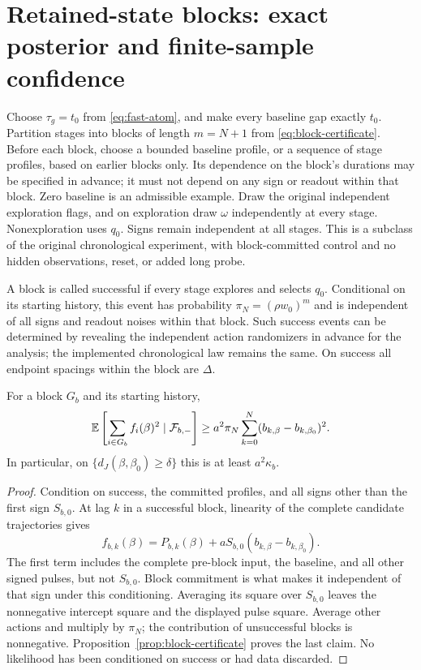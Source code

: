 \section{Retained-state blocks: exact posterior and finite-sample confidence}
\label{sec:blocks}
Choose $\tau_g=t_0$ from \eqref{eq:fast-atom}, and make every baseline gap exactly
$t_0$. Partition stages into blocks of length $m=N+1$ from
\eqref{eq:block-certificate}. Before each block, choose a bounded baseline
profile, or a sequence of stage profiles, based on earlier blocks only.
Its dependence on the block's durations may be specified in advance; it must
not depend on any sign or readout within that block. Zero baseline is an
admissible example. Draw the original independent exploration flags, and on
exploration draw $\omega$ independently at every stage. Nonexploration uses
$q_0$. Signs remain independent at all stages. This is a subclass of the
original chronological experiment, with block-committed control and no hidden
observations, reset, or added long probe.

A block is called successful if every stage explores and selects $q_0$.
Conditional on its starting history, this event has probability
$\pi_N=(\rho w_0)^m$ and is independent of all signs and readout noises within
that block. Such success events can be determined by revealing the independent
action randomizers in advance for the analysis; the implemented chronological
law remains the same. On success all endpoint spacings within the block are
$\Delta$.

\begin{lemma}
\label{lem:block-floor}
For a block $G_b$ and its starting history,
\begin{equation}
 \mathbb E\left[\sum_{i\in G_b}f_i(\beta)^2\mid\mathcal F_{b,-}\right]
 \ge a^2\pi_N\sum_{k=0}^N(b_{k,\beta}-b_{k,\beta_0})^2.
 \label{eq:block-floor}
\end{equation}
In particular, on $\{d_J(\beta,\beta_0)\ge\delta\}$ this is at least
$a^2\kappa_b$.
\end{lemma}
\begin{proof}
Condition on success, the committed profiles, and all signs other than the
first sign $S_{b,0}$. At lag $k$ in a successful block, linearity of the complete
candidate trajectories gives
\[
 f_{b,k}(\beta)=P_{b,k}(\beta)
       +aS_{b,0}(b_{k,\beta}-b_{k,\beta_0}).
\]
The first term includes the complete pre-block input, the baseline, and all
other signed pulses, but not $S_{b,0}$. Block commitment is what makes it
independent of that sign under this conditioning. Averaging its square over
$S_{b,0}$ leaves the nonnegative intercept square and the displayed pulse square.
Average other actions and multiply by $\pi_N$; the contribution of unsuccessful
blocks is nonnegative. Proposition~\ref{prop:block-certificate} proves the last
claim. No likelihood has been conditioned on success or had data discarded.
\end{proof}

